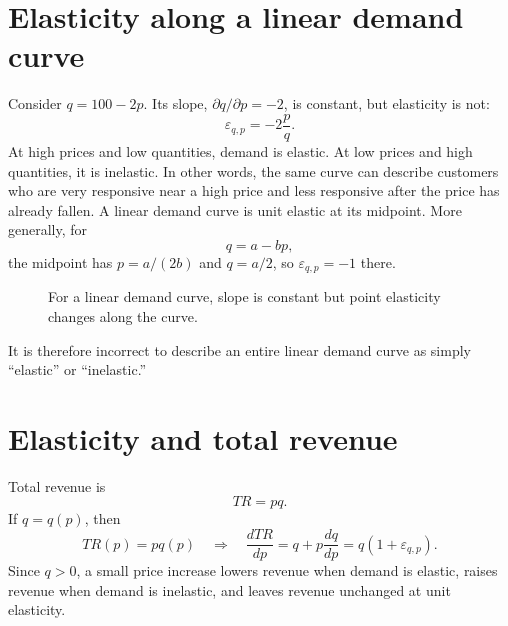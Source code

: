 \section{Elasticity along a linear demand curve}

Consider $q=100-2p$. Its slope, $\partial q/\partial p=-2$, is constant, but elasticity is not:
\[
\varepsilon_{q,p}=-2\frac{p}{q}.
\]
At high prices and low quantities, demand is elastic. At low prices and high quantities, it is inelastic. In other words, the same curve can describe customers who are very responsive near a high price and less responsive after the price has already fallen. A linear demand curve is unit elastic at its midpoint. More generally, for
\[
q=a-bp,
\]
the midpoint has $p=a/(2b)$ and $q=a/2$, so
$\varepsilon_{q,p}=-1$ there.

\begin{figure}[!ht]
  \centering
  \caption{For a linear demand curve, slope is constant but point elasticity changes along the curve.}
  \label{fig:linear-demand-elasticity}
\end{figure}

It is therefore incorrect to describe an entire linear demand curve as simply ``elastic'' or ``inelastic.''

\section{Elasticity and total revenue}

Total revenue is
\[
TR=pq.
\]
If $q=q(p)$, then
\[
TR(p)=pq(p)
\quad\Longrightarrow\quad
\frac{dTR}{dp}
=
q+p\frac{dq}{dp}
=
q\left(1+\varepsilon_{q,p}\right).
\]
Since $q>0$, a small price increase lowers revenue when demand is elastic,
raises revenue when demand is inelastic, and leaves revenue unchanged at unit
elasticity.

